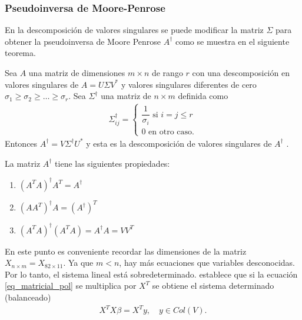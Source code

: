 \subsubsection{Pseudoinversa de Moore-Penrose}

En la descomposición de valores singulares se puede modificar la matriz $\Sigma$ para obtener la pseudoinversa de Moore Penrose $A^{\dagger}$ como se muestra en el siguiente teorema. 

\begin{theorem}
Sea $A$ una matriz de dimensiones $m \times n$ de rango $r$ con una descomposición en valores singulares de $A = U \Sigma V^{*}$ y valores singulares diferentes de cero $\sigma_1 \geq \sigma_2 \geq \dots \geq \sigma_r$. Sea $\Sigma^{\dagger}$ una matriz de $n \times m$ definida como
\begin{equation*}
    \begin{aligned}
   \Sigma^{\dagger}_{ij} =
   \begin{cases}
   \dfrac{1}{\sigma_i} \text{ si } i = j \leq r\\
   0 \text{ en otro caso.}
   \end{cases}
    \end{aligned}
\end{equation*}
Entonces $A^{\dagger} = V \Sigma^{\dagger} U ^{*}$ y esta es la descomposición de valores singulares de $A^{\dagger}$
\cite[p.~414]{friedberglinearalgebra}.
\end{theorem}


La matriz $A^{\dagger}$ tiene las siguientes propiedades:

\begin{enumerate}
    \item $(A^{T}A)^{\dagger} A^{T} = A^{\dagger}$
    \item $(AA^{T})^{\dagger} A = (A^{\dagger})^{T}$
    \item $(A^{T}A)^{\dagger}(A^{T}A) = A^{\dagger}A = VV^{T}$
\end{enumerate}

En este punto es conveniente recordar las dimensiones de la matriz $X_{n \times m} = X_{82 \times 11}$. Ya que $m < n$, hay más ecuaciones que variables desconocidas. Por lo tanto, el sistema lineal está sobredeterminado. \cite{worldScientificNews} establece que si la ecuación \ref{eq_matricial_pol} se multiplica por $X^{T}$ se obtiene el sistema determinado (balanceado)
\begin{equation}
\label{transformacion_eq_base}
    \begin{aligned}
    X^{T}X \beta = X^{T} y, \quad y \in Col(V).
    \end{aligned}
\end{equation}

